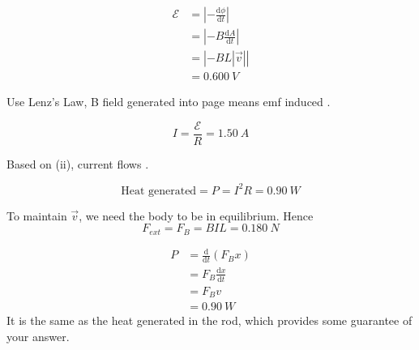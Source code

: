 \begin{solution}
    \begin{subsolution}
        \begin{align}
            \mathcal{E} &= \left|-\frac{\mathrm{d}\phi}{\mathrm{d}t}\right| \\
                        &= \left|-B\frac{\mathrm{d}A}{\mathrm{d}t}\right| \\
                        &= \left|-B L \left|\Vec{v}\right|\right| \\
                        &= \boxed{\qty{0.600}{V}}
        \end{align}
    \end{subsolution}
    \begin{subsolution}
        Use Lenz's Law, B field generated into page means emf induced .
    \end{subsolution}
    \begin{subsolution}
        \[I = \frac{\mathcal{E}}{R} = \boxed{\qty{1.50}{A}}\]
    \end{subsolution}
    \begin{subsolution}
        Based on (ii), current flows .
    \end{subsolution}
    \begin{subsolution}
        \[\text{Heat generated} = P = I^2R = \boxed{\qty{0.90}{W}}\]
    \end{subsolution}
    \begin{subsolution}
        To maintain $\Vec{v}$, we need the body to be in equilibrium. Hence
        \[F_{ext} = F_{B} = BIL = \boxed{\qty{0.180}{N}}\]
    \end{subsolution}
    \begin{subsolution}
        \begin{align}
            P &= \frac{\mathrm{d}}{\mathrm{d}t} (F_B x) \\
            &=  F_B \frac{\mathrm{d}x}{\mathrm{d}t} \\
            &= F_B v \\
            &= \boxed{\qty{0.90}{W}}
        \end{align}
        It is the same as the heat generated in the rod, which provides some guarantee of your answer. 
    \end{subsolution}
\end{solution}
\newpage
